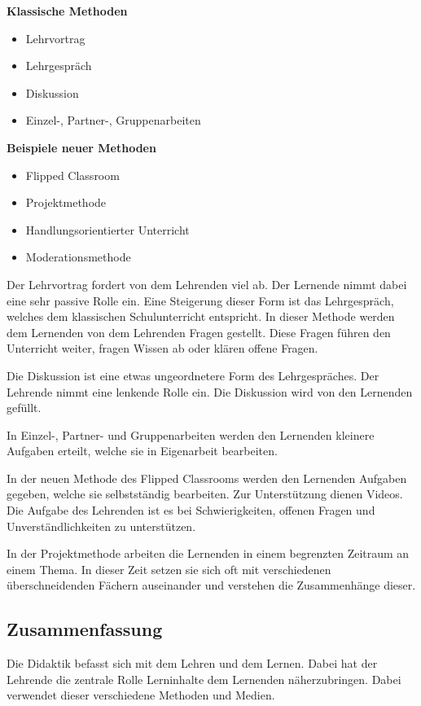  \textbf{Klassische Methoden}
 \begin{itemize}
     \item Lehrvortrag
     \item Lehrgespräch
     \item Diskussion
     \item Einzel-, Partner-, Gruppenarbeiten
 \end{itemize}
 \textbf{Beispiele neuer Methoden}
\begin{itemize}
    \item Flipped Classroom
    \item Projektmethode
    \item Handlungsorientierter Unterricht
    \item Moderationsmethode
\end{itemize}

Der Lehrvortrag fordert von dem Lehrenden viel ab. Der Lernende nimmt dabei eine sehr passive Rolle ein. Eine Steigerung dieser Form ist das Lehrgespräch, welches dem klassischen Schulunterricht entspricht. In dieser Methode werden dem Lernenden von dem Lehrenden Fragen gestellt. Diese Fragen führen den Unterricht weiter, fragen Wissen ab oder klären offene Fragen. 

Die Diskussion ist eine etwas ungeordnetere Form des Lehrgespräches. Der Lehrende nimmt eine lenkende Rolle ein. Die Diskussion wird von den Lernenden gefüllt. 

In Einzel-, Partner- und Gruppenarbeiten werden den Lernenden kleinere Aufgaben erteilt, welche sie in Eigenarbeit bearbeiten. 

In der neuen Methode des Flipped Classrooms werden den Lernenden Aufgaben gegeben, welche sie selbstständig bearbeiten. Zur Unterstützung dienen Videos. Die Aufgabe des Lehrenden ist es bei Schwierigkeiten, offenen Fragen und Unverständlichkeiten zu unterstützen. 

In der Projektmethode arbeiten die Lernenden in einem begrenzten Zeitraum an einem Thema. In dieser Zeit setzen sie sich oft mit verschiedenen überschneidenden Fächern auseinander und verstehen die Zusammenhänge dieser. \autocite[Die Ausführungen in diesem Kapitel beziehen sich weitgehend auf][]{Lehner.2019}

\subsection{Zusammenfassung}

Die Didaktik befasst sich mit dem Lehren und dem Lernen. Dabei hat der Lehrende die zentrale Rolle Lerninhalte dem Lernenden näherzubringen. Dabei verwendet dieser verschiedene Methoden und Medien. 

